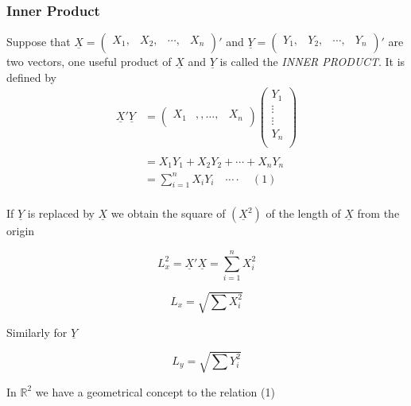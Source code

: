 \documentclass[11pt,a4paper]{article}
\theoremstyle{definition}
\begin{document}
\subsubsection{Inner Product}
Suppose that $\underline{X} = 
\begin{pmatrix}
X_1, & X_2, & \cdots, & X_n\\
\end{pmatrix}'$ and $\underline{Y} = \begin{pmatrix}
Y_1, & Y_2, & \cdots, & Y_n\\
\end{pmatrix}'$ are two vectors, one useful product of $\underline{X}$ and $\underline{Y}$ is called the \textit{INNER PRODUCT}. It is defined by 
\begin{align*}
\underline{X}'\underline{Y} & = \begin{pmatrix}
X_1 & ,, \ldots, & X_n\\
\end{pmatrix}
\begin{pmatrix}
Y_1\\
\vdots\\
\vdots\\
Y_n\\
\end{pmatrix}\\\\
& = X_1Y_1 + X_2Y_2 + \cdots+ X_nY_n\\
& = \sum^n_{i=1}X_iY_i\quad \cdots\cdot\quad  (1)\\
\end{align*}

If $\underline{Y}$ is replaced by $\underline{X}$ we obtain the square of $(\underline{X}^2)$ of the length of $\underline{X}$ from the origin

$$L^2_x = \underline{X}'\underline{X}= \sum^n_{i=1}X^2_i$$

\begin{equation}\tag{2}
L_x = \sqrt{\sum X_i^2}
\end{equation}

Similarly for $\underline{Y}$

\begin{equation}\tag{3}
L_y = \sqrt{\sum Y_i^2}
\end{equation}

In $\mathbb{R}^2$ we have a geometrical concept to the relation  (1)
\end{document}
